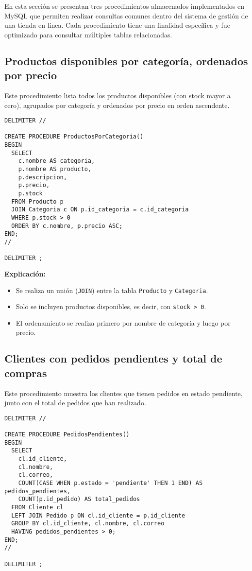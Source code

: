 En esta sección se presentan tres procedimientos almacenados implementados en MySQL que permiten realizar consultas comunes dentro del sistema de gestión de una tienda en línea. Cada procedimiento tiene una finalidad específica y fue optimizado para consultar múltiples tablas relacionadas.

\subsection{Productos disponibles por categoría, ordenados por precio}

Este procedimiento lista todos los productos disponibles (con stock mayor a cero), agrupados por categoría y ordenados por precio en orden ascendente.

\begin{lstlisting}
DELIMITER //

CREATE PROCEDURE ProductosPorCategoria()
BEGIN
  SELECT 
    c.nombre AS categoria,
    p.nombre AS producto,
    p.descripcion,
    p.precio,
    p.stock
  FROM Producto p
  JOIN Categoria c ON p.id_categoria = c.id_categoria
  WHERE p.stock > 0
  ORDER BY c.nombre, p.precio ASC;
END;
//

DELIMITER ;
\end{lstlisting}

\textbf{Explicación:}
\begin{itemize}
  \item Se realiza un unión (\texttt{JOIN}) entre la tabla \texttt{Producto} y \texttt{Categoria}.
  \item Solo se incluyen productos disponibles, es decir, con \texttt{stock > 0}.
  \item El ordenamiento se realiza primero por nombre de categoría y luego por precio.
\end{itemize}

\subsection{Clientes con pedidos pendientes y total de compras}

Este procedimiento muestra los clientes que tienen pedidos en estado pendiente, junto con el total de pedidos que han realizado.

\begin{lstlisting}
DELIMITER //

CREATE PROCEDURE PedidosPendientes()
BEGIN
  SELECT 
    cl.id_cliente,
    cl.nombre,
    cl.correo,
    COUNT(CASE WHEN p.estado = 'pendiente' THEN 1 END) AS pedidos_pendientes,
    COUNT(p.id_pedido) AS total_pedidos
  FROM Cliente cl
  LEFT JOIN Pedido p ON cl.id_cliente = p.id_cliente
  GROUP BY cl.id_cliente, cl.nombre, cl.correo
  HAVING pedidos_pendientes > 0;
END;
//

DELIMITER ;
\end{lstlisting}

